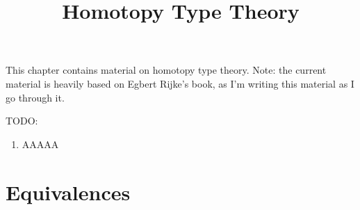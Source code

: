 

%



\title{Homotopy Type Theory}

\maketitle

\label{section-phantom}

This chapter contains material on homotopy type theory. Note: the current material is heavily based on Egbert Rijke's book, as I'm writing this material as I go through it.

\ChapterTableOfContents

TODO:
\begin{enumerate}
    \item AAAAA
\end{enumerate}

\section{Equivalences}\label{section-hott-equivalences}
\begin{appendices}

\end{appendices}

